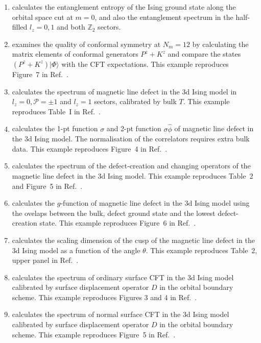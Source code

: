 \documentclass{timesjhep}
\begin{document}
\begin{enumerate}
    \item {} calculates the entanglement entropy of the Ising ground state along the orbital space cut at $m = 0$, and also the entanglement spectrum in the half-filled $l_z = 0,1$ and both $\mathbb{Z}_2$ sectors.
    \item {} examines the quality of conformal symmetry at $N_m = 12$ by calculating the matrix elements of conformal generators $P^z + K^z$ and compare the states $(P^z + K^z)|\Phi\rangle$ with the CFT expectations. This example reproduces Figure~7 in Ref.~\cite{Fardelli2024}.
    \item {} calculates the spectrum of magnetic line defect in the 3d Ising model in $l_z=0,\mathcal{P}=\pm 1$ and $l_z = 1$ sectors, calibrated by bulk $T$. This example reproduces Table~I in Ref.~\cite{Hu2023Aug}.
    \item {} calculates the 1-pt function $\sigma$ and 2-pt function $\sigma\hat{\phi}$ of magnetic line defect in the 3d Ising model. The normalisation of the correlators requires extra bulk data. This example reproduces Figure~4 in Ref.~\cite{Hu2023Aug}.
    \item {} calculates the spectrum of the defect-creation and changing operators of the magnetic line defect in the 3d Ising model. This example reproduces Table~2 and Figure~5 in Ref.~\cite{Zhou2024Jan}.
    \item {} calculates the $g$-function of magnetic line defect in the 3d Ising model using the ovelaps between the bulk, defect ground state and the lowest defect-creation state. This example reproduces Figure~6 in Ref.~\cite{Zhou2024Jan}.
    \item {} calculates the scaling dimension of the cusp of the magnetic line defect in the 3d Ising model as a function of the angle $\theta$. This example reproduces Table~2, upper panel in Ref.~\cite{Cuomo2024}.
    \item {} calculates the spectrum of ordinary surface CFT in the 3d Ising model calibrated by surface displacement operator $D$ in the orbital boundary scheme. This example reproduces Figures 3 and 4 in Ref.~\cite{Zhou2024Jul}.
    \item {} calculates the spectrum of normal surface CFT in the 3d Ising model calibrated by surface displacement operator $D$ in the orbital boundary scheme. This example reproduces Figure~5 in Ref.~\cite{Zhou2024Jul}.

\end{enumerate}
\end{document}
